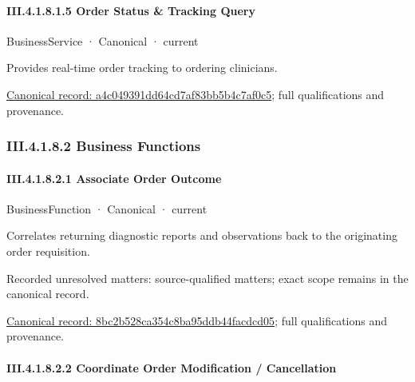\paragraph*{III.4.1.8.1.5 Order Status \& Tracking Query}
\label{navigation:III.4.1.8.1.5}

\label{element:a4c049391dd64cd7af83bb5b4c7af0c5}
{\small BusinessService · Canonical · current}\par

Provides real-time order tracking to ordering clinicians.


{\footnotesize \href{../../../../continuum/business/business-service/a4c049391dd64cd7af83bb5b4c7af0c5.md}{Canonical record: a4c049391dd64cd7af83bb5b4c7af0c5}; full qualifications and provenance.}\par
\subsubsection*{III.4.1.8.2 Business Functions}
\label{navigation:III.4.1.8.2}

\paragraph*{III.4.1.8.2.1 Associate Order Outcome}
\label{navigation:III.4.1.8.2.1}

\label{element:8bc2b528ca354c8ba95ddb44facdcd05}
{\small BusinessFunction · Canonical · current}\par

Correlates returning diagnostic reports and observations back to the originating order requisition.


{\small Recorded unresolved matters: source-qualified matters; exact scope remains in the canonical record.}\par
{\footnotesize \href{../../../../continuum/business/business-function/8bc2b528ca354c8ba95ddb44facdcd05.md}{Canonical record: 8bc2b528ca354c8ba95ddb44facdcd05}; full qualifications and provenance.}\par
\paragraph*{III.4.1.8.2.2 Coordinate Order Modification / Cancellation}
\label{navigation:III.4.1.8.2.2}

